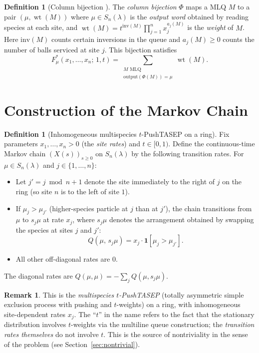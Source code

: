 \documentclass[12pt]{article}
\theoremstyle{definition}
\newtheorem{definition}[theorem]{Definition}
\newtheorem{remark}[theorem]{Remark}
\DeclareMathOperator{\wt}{wt}
\begin{document}
\begin{definition}[Column bijection {\cite{CMW22}}]
\label{def:colbij}
The \emph{column bijection} $\Phi$ maps a MLQ $M$ to a pair $(\mu, \wt(M))$
where $\mu \in S_n(\lambda)$ is the \emph{output word} obtained by reading
species at each site, and $\wt(M) = t^{\mathrm{inv}(M)} \prod_{j=1}^n x_j^{a_j(M)}$
is the \emph{weight} of $M$.  Here $\mathrm{inv}(M)$ counts certain inversions in
the queue and $a_j(M) \geq 0$ counts the number of balls serviced at site $j$.
This bijection satisfies
\[
  F^*_\mu(x_1,\dots,x_n;\,1,t) = \sum_{\substack{M \text{ MLQ} \\ \text{output}(\Phi(M)) = \mu}} \wt(M).
\]
\end{definition}

\section{Construction of the Markov Chain}

\begin{definition}[Inhomogeneous multispecies $t$-PushTASEP on a ring]
\label{def:chain}
Fix parameters $x_1, \dots, x_n > 0$ (the \emph{site rates}) and $t \in [0,1)$.
Define the continuous-time Markov chain $(X(s))_{s \geq 0}$ on $S_n(\lambda)$
by the following transition rates.  For $\mu \in S_n(\lambda)$ and
$j \in \{1, \dots, n\}$:
\begin{itemize}
\item Let $j' = j \bmod n + 1$ denote the site immediately to the right of $j$
  on the ring (so site $n$ is to the left of site $1$).
\item If $\mu_j > \mu_{j'}$ (higher-species particle at $j$ than at $j'$), the
  chain transitions from $\mu$ to $s_j \mu$ at rate $x_j$, where
  $s_j \mu$ denotes the arrangement obtained by swapping the species at sites
  $j$ and $j'$:
  \[
    Q(\mu,\, s_j\mu) = x_j \cdot \mathbf{1}[\mu_j > \mu_{j'}].
  \]
\item All other off-diagonal rates are $0$.
\end{itemize}
The diagonal rates are $Q(\mu,\mu) = -\sum_j Q(\mu, s_j \mu)$.
\end{definition}

\begin{remark}
This is the \emph{multispecies $t$-PushTASEP} (totally asymmetric simple
exclusion process with pushing and $t$-weights) on a ring, with inhomogeneous
site-dependent rates $x_j$.  The ``$t$'' in the name refers to the fact that the
stationary distribution involves $t$-weights via the multiline queue construction;
the \emph{transition rates themselves} do not involve $t$.  This is the source of
nontriviality in the sense of the problem (see Section~\ref{sec:nontrivial}).
\end{remark}
\end{document}
